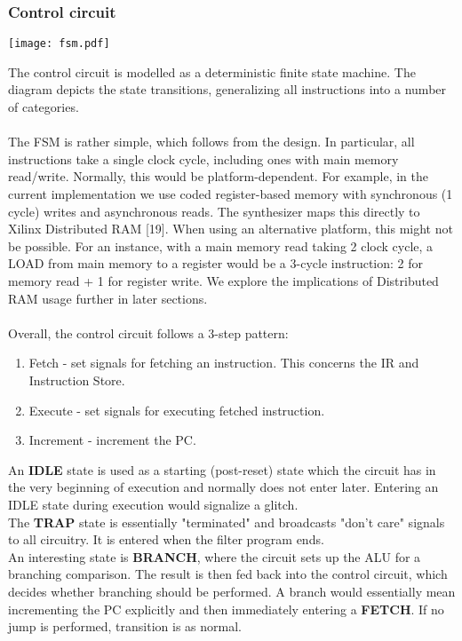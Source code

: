\documentclass{l4proj}
\begin{document}
\subsubsection{Control circuit}
\begin{center}
\texttt{[image: fsm.pdf]}\\
\end{center}
The control circuit is modelled as a deterministic finite state machine. The diagram depicts the state transitions, generalizing all instructions into a number of categories.\\\\
The FSM is rather simple, which follows from the design. In particular, all instructions take a single clock cycle, including ones with main memory read/write. Normally, this would be platform-dependent. For example, in the current implementation we use coded register-based memory with synchronous (1 cycle) writes and asynchronous reads. The synthesizer maps this directly to Xilinx Distributed RAM [19]. When using an alternative platform, this might not be possible. For an instance, with a main memory read taking 2 clock cycle, a LOAD from main memory to a register would be a 3-cycle instruction: 2 for memory read + 1 for register write. We explore the implications of Distributed RAM usage further in later sections.\\\\
Overall, the control circuit follows a 3-step pattern:
\begin{enumerate}
    \item Fetch - set signals for fetching an instruction. This concerns the IR and Instruction Store.
    \item Execute - set signals for executing fetched instruction.
    \item Increment - increment the PC.
\end{enumerate}
An \textbf{IDLE} state is used as a starting (post-reset) state which the circuit has in the very beginning of execution and normally does not enter later. Entering an IDLE state during execution would signalize a glitch.\\
The \textbf{TRAP} state is essentially "terminated" and broadcasts "don't care" signals to all circuitry. It is entered when the filter program ends.\\
An interesting state is \textbf{BRANCH}, where the circuit sets up the ALU for a branching comparison. The result is then fed back into the control circuit, which decides whether branching should be performed. A branch would essentially mean incrementing the PC explicitly and then immediately entering a \textbf{FETCH}. If no jump is performed, transition is as normal.
\end{document}
